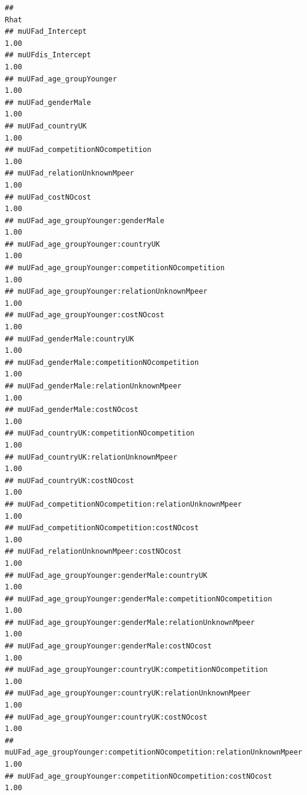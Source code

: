 \documentclass[
]{article}
\begin{document}
\begin{verbatim}
##                                                                        Rhat
## muUFad_Intercept                                                       1.00
## muUFdis_Intercept                                                      1.00
## muUFad_age_groupYounger                                                1.00
## muUFad_genderMale                                                      1.00
## muUFad_countryUK                                                       1.00
## muUFad_competitionNOcompetition                                        1.00
## muUFad_relationUnknownMpeer                                            1.00
## muUFad_costNOcost                                                      1.00
## muUFad_age_groupYounger:genderMale                                     1.00
## muUFad_age_groupYounger:countryUK                                      1.00
## muUFad_age_groupYounger:competitionNOcompetition                       1.00
## muUFad_age_groupYounger:relationUnknownMpeer                           1.00
## muUFad_age_groupYounger:costNOcost                                     1.00
## muUFad_genderMale:countryUK                                            1.00
## muUFad_genderMale:competitionNOcompetition                             1.00
## muUFad_genderMale:relationUnknownMpeer                                 1.00
## muUFad_genderMale:costNOcost                                           1.00
## muUFad_countryUK:competitionNOcompetition                              1.00
## muUFad_countryUK:relationUnknownMpeer                                  1.00
## muUFad_countryUK:costNOcost                                            1.00
## muUFad_competitionNOcompetition:relationUnknownMpeer                   1.00
## muUFad_competitionNOcompetition:costNOcost                             1.00
## muUFad_relationUnknownMpeer:costNOcost                                 1.00
## muUFad_age_groupYounger:genderMale:countryUK                           1.00
## muUFad_age_groupYounger:genderMale:competitionNOcompetition            1.00
## muUFad_age_groupYounger:genderMale:relationUnknownMpeer                1.00
## muUFad_age_groupYounger:genderMale:costNOcost                          1.00
## muUFad_age_groupYounger:countryUK:competitionNOcompetition             1.00
## muUFad_age_groupYounger:countryUK:relationUnknownMpeer                 1.00
## muUFad_age_groupYounger:countryUK:costNOcost                           1.00
## muUFad_age_groupYounger:competitionNOcompetition:relationUnknownMpeer  1.00
## muUFad_age_groupYounger:competitionNOcompetition:costNOcost            1.00

\end{verbatim}
\end{document}
